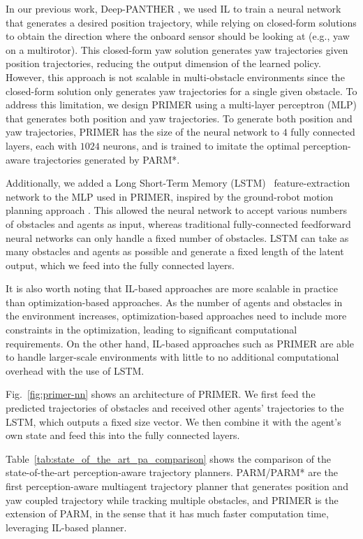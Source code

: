 In our previous work, Deep-PANTHER \cite{tordesillas2023deep}, we used IL to train a neural network that generates a desired position trajectory, while relying on closed-form solutions to obtain the direction where the onboard sensor should be looking at (e.g., yaw on a multirotor). This closed-form yaw solution generates yaw trajectories given position trajectories, reducing the output dimension of the learned policy. However, this approach is not scalable in multi-obstacle environments since the closed-form solution only generates yaw trajectories for a single given obstacle.
To address this limitation, we design PRIMER using a multi-layer perceptron (MLP) that generates both position and yaw trajectories. 
To generate both position and yaw trajectories, PRIMER has the size of the neural network to $4$ fully connected layers, each with $1024$ neurons, and is trained to imitate the optimal perception-aware trajectories generated by PARM*.

Additionally, we added a Long Short-Term Memory (LSTM)~\cite{HochSchm97} feature-extraction network to the MLP used in PRIMER, inspired by the ground-robot motion planning approach \cite{everett2018motion}. 
This allowed the neural network to accept various numbers of obstacles and agents as input, whereas traditional fully-connected feedforward neural networks can only handle a fixed number of obstacles. LSTM can take as many obstacles and agents as possible and generate a fixed length of the latent output, which we feed into the fully connected layers. 

It is also worth noting that IL-based approaches are more scalable in practice than optimization-based approaches. As the number of agents and obstacles in the environment increases, optimization-based approaches need to include more constraints in the optimization, leading to significant computational requirements. On the other hand,  IL-based approaches such as PRIMER are able to handle larger-scale environments with little to no additional computational overhead with the use of LSTM.

Fig.~\ref{fig:primer-nn} shows an architecture of PRIMER. We first feed the predicted trajectories of obstacles and received other agents' trajectories to the LSTM, which outputs a fixed size vector.
We then combine it with the agent's own state and feed this into the fully connected layers.

Table~\ref{tab:state_of_the_art_pa_comparison} shows the comparison of the state-of-the-art perception-aware trajectory planners. PARM/PARM* are the first perception-aware multiagent trajectory planner that generates position and yaw coupled trajectory while tracking multiple obstacles, and PRIMER is the extension of PARM, in the sense that it has much faster computation time, leveraging IL-based planner.

